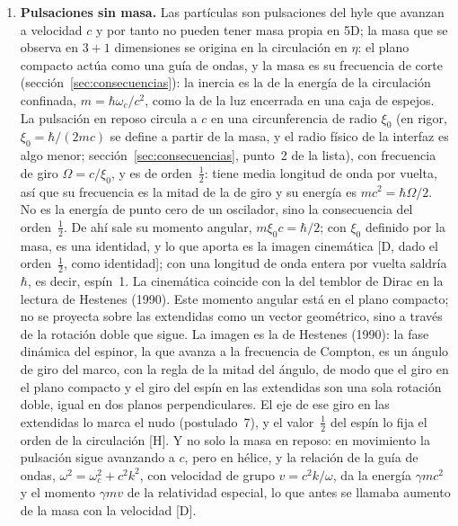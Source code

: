 \documentclass[11pt,a4paper]{article}
\newcommand{\st}[1]{\textup{[#1]}}
\begin{document}
\begin{enumerate}[label=\arabic*.,leftmargin=*]
coherencia con la geometría del plano compacto; la longitud de arco sobre la capa de radio $\xi$ es $\xi\eta$.) En reposo toda su velocidad $c$ va a lo largo de la capa; en movimiento recorre una hélice (postulado~6) y avanza sobre ella a $\sqrt{c^2-v^2}$, así que $\xi_0\,d\eta = c\,dt/\gamma = c\,d\tau$, que es la dilatación temporal \st{D, dada la hélice}. La misma lectura del tiempo propio, como avance en una dimensión compacta, aparece de forma independiente en Alcerro Mena (2018).

\item \textbf{Pulsaciones sin masa.} Las partículas son pulsaciones del hyle que avanzan a velocidad $c$ y por tanto no pueden tener masa propia en 5D; la masa que se observa en $3+1$ dimensiones se origina en la circulación en $\eta$: el plano compacto actúa como una guía de ondas, y la masa es su frecuencia de corte (sección~\ref{sec:consecuencias}): la inercia es la de la energía de la circulación confinada, $m=\hbar\omega_c/c^2$, como la de la luz encerrada en una caja de espejos. La pulsación en reposo circula a $c$ en una circunferencia de radio $\xi_0$ (en rigor, $\xi_0=\hbar/(2mc)$ se define a partir de la masa, y el radio físico de la interfaz es algo menor; sección~\ref{sec:consecuencias}, punto~2 de la lista), con frecuencia de giro $\Omega=c/\xi_0$, y es de orden~$\tfrac12$: tiene media longitud de onda por vuelta, así que su frecuencia es la mitad de la de giro y su energía es $mc^2=\hbar\Omega/2$. No es la energía de punto cero de un oscilador, sino la consecuencia del orden~$\tfrac12$. De ahí sale su momento angular, $m\xi_0c=\hbar/2$; con $\xi_0$ definido por la masa, es una identidad, y lo que aporta es la imagen cinemática \st{D, dado el orden~$\tfrac12$, como identidad}; con una longitud de onda entera por vuelta saldría $\hbar$, es decir, espín~1. La cinemática coincide con la del temblor de Dirac en la lectura de Hestenes (1990). Este momento angular está en el plano compacto; no se proyecta sobre las extendidas como un vector geométrico, sino a través de la rotación doble que sigue. La imagen es la de Hestenes (1990): la fase dinámica del espinor, la que avanza a la frecuencia de Compton, es un ángulo de giro del marco, con la regla de la mitad del ángulo, de modo que el giro en el plano compacto y el giro del espín en las extendidas son una sola rotación doble, igual en dos planos perpendiculares. El eje de ese giro en las extendidas lo marca el nudo (postulado~7), y el valor~$\tfrac12$ del espín lo fija el orden de la circulación \st{H}. Y no solo la masa en reposo: en movimiento la pulsación sigue avanzando a $c$, pero en hélice, y la relación de la guía de ondas, $\omega^2=\omega_c^2+c^2k^2$, con velocidad de grupo $v=c^2k/\omega$, da la energía $\gamma mc^2$ y el momento $\gamma mv$ de la relatividad especial, lo que antes se llamaba aumento de la masa con la velocidad \st{D}.


\end{enumerate}
\end{document}
